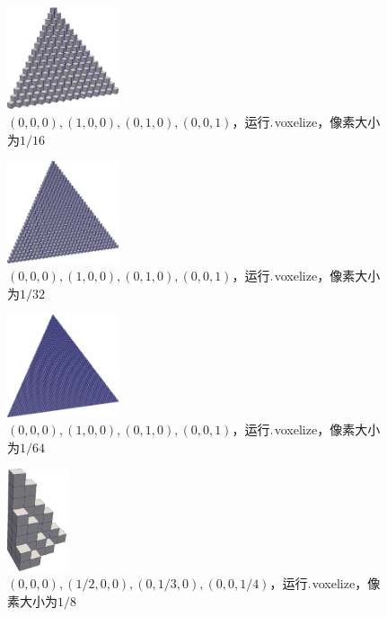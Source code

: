 \begin{figure}[!htbp]
  \centering
  \includegraphics[height=3cm]{fig/1/1.2/2.png}
  \caption{$(0,0,0),(1,0,0),(0,1,0),(0,0,1)$，运行$.\\$voxelize，像素大小为$1/16$}
  \label{fig:1-7}
\end{figure}

\begin{figure}[!htbp]
  \centering
  \includegraphics[height=3cm]{fig/1/1.2/3.png}
    \caption{$(0,0,0),(1,0,0),(0,1,0),(0,0,1)$，运行$.\\$voxelize，像素大小为$1/32$}
  \label{fig:1-7}
\end{figure}

\begin{figure}[!htbp]
  \centering
  \includegraphics[height=3cm]{fig/1/1.2/4.png}
    \caption{$(0,0,0),(1,0,0),(0,1,0),(0,0,1)$，运行$.\\$voxelize，像素大小为$1/64$}
  \label{fig:1-7}
\end{figure}

\begin{figure}[!htbp]
  \centering
  \includegraphics[height=3cm]{fig/1/1.2/5.png}
  \caption{$(0,0,0),(1/2,0,0),(0,1/3,0),(0,0,1/4)$，运行$.\\$voxelize，像素大小为$1/8$}
  \label{fig:1-7}
\end{figure}

